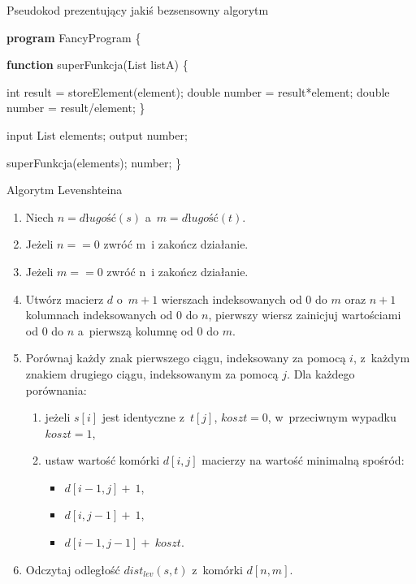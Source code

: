 \documentclass[twoside,a4paper]{book}
\begin{document}
\begin{algorithm}
 \caption{Pseudokod prezentujący jakiś bezsensowny algorytm}
 \label{tboi:alg}
 \begin{algorithmic}[1]
\STATE \textbf{program} FancyProgram \{

\STATE \textbf{function} superFunkcja(List listA) \{

\STATE int result = storeElement(element);
\STATE double number = result*element;
\STATE double number = result/element;
\ENDIF
\ENDFOR
\STATE \}

\STATE input List elements;
\STATE output number;

\STATE superFunkcja(elements);
\RETURN number;
\STATE \}
 \end{algorithmic}
\end{algorithm}

\begin{algorithm}
 \caption{Algorytm Levenshteina}
 \label{tboi:alg_leven}
\begin{enumerate}
 \item Niech $n = \textit{długość}(s)$ a~$m = \textit{długość}(t)$.
 \item Jeżeli $n == 0$ zwróć m~i zakończ działanie.
 \item Jeżeli $m == 0$ zwróć n~i zakończ działanie.
 \item Utwórz macierz $d$ o~$m+1$ wierszach indeksowanych od $0$ do $m$ oraz $n+1$ kolumnach indeksowanych od $0$ do $n$, pierwszy wiersz zainicjuj wartościami od $0$ do $n$ a~pierwszą kolumnę od $0$ do $m$.
 \item Porównaj każdy znak pierwszego ciągu, indeksowany za pomocą $i$, z~każdym znakiem drugiego ciągu, indeksowanym za pomocą $j$. Dla każdego porównania:
\begin{enumerate}
 \item jeżeli $s[i]$ jest identyczne z~$t[j]$, $koszt = 0$, w~przeciwnym wypadku $koszt = 1$,
 \item ustaw wartość komórki $d[i,j]$ macierzy na wartość minimalną spośród:
\begin{itemize}
 \item $d[i-1,j] +~1$,
 \item $d[i,j-1] +~1$,
 \item $d[i-1,j-1] +~koszt$.
\end{itemize}
\end{enumerate}
 \item Odczytaj odległość $dist_{lev}(s,t)$ z~komórki $d[n,m]$.
\end{enumerate}
\end{algorithm}
\end{document}

